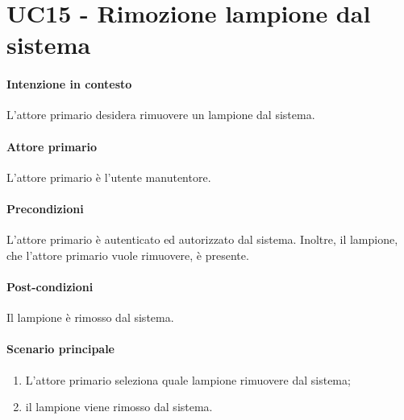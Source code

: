 \section{UC15 - Rimozione lampione dal sistema}\label{uc:15}


\paragraph{Intenzione in contesto}
L'attore primario desidera rimuovere un lampione dal sistema.
\paragraph{Attore primario}L'attore primario è l'utente manutentore.

\paragraph{Precondizioni} L'attore primario è autenticato ed autorizzato dal sistema. Inoltre, il lampione, che l'attore primario vuole rimuovere, è presente.

\paragraph{Post-condizioni} Il lampione è rimosso dal sistema.
\paragraph{Scenario principale}
\begin{enumerate}
    \item L'attore primario seleziona quale lampione rimuovere dal sistema;
    \item il lampione viene rimosso dal sistema.
\end{enumerate}